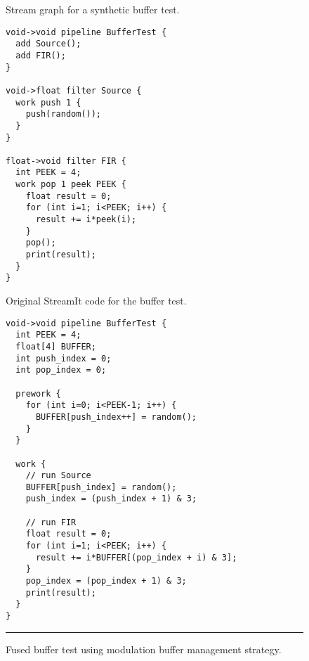 \begin{figure*}[t]
\begin{minipage}{1.7in}
\centering
{}

\caption{Stream graph for a synthetic buffer test.\protect\label{fig:code-graph}}
\end{minipage}
\hspace{0.3in}
\begin{minipage}{2.2in}
\centering
{\scriptsize
\begin{verbatim}
void->void pipeline BufferTest {
  add Source();
  add FIR();
}

void->float filter Source {
  work push 1 {
    push(random());
  }
}

float->void filter FIR {
  int PEEK = 4;
  work pop 1 peek PEEK {
    float result = 0;
    for (int i=1; i<PEEK; i++) {
      result += i*peek(i);
    }
    pop();
    print(result);
  }
}
\end{verbatim}}

\caption{Original StreamIt code for the buffer test.\protect\label{fig:code-orig}}
\end{minipage}
\hspace{0.3in}
%
\begin{minipage}{2.2in}
\centering
{\scriptsize
\begin{verbatim}
void->void pipeline BufferTest {
  int PEEK = 4;
  float[4] BUFFER;
  int push_index = 0;
  int pop_index = 0;

  prework {
    for (int i=0; i<PEEK-1; i++) {
      BUFFER[push_index++] = random();
    }
  }

  work {
    // run Source
    BUFFER[push_index] = random();
    push_index = (push_index + 1) & 3;
    
    // run FIR
    float result = 0;
    for (int i=1; i<PEEK; i++) {
      result += i*BUFFER[(pop_index + i) & 3];
    }
    pop_index = (pop_index + 1) & 3;
    print(result);
  }
}
\end{verbatim}}

\caption{Fused buffer test using modulation buffer management strategy.\protect\label{fig:code-modulation}}
\end{minipage}
\vspace{6pt}
\hrule
\vspace{6pt}
\end{figure*}
